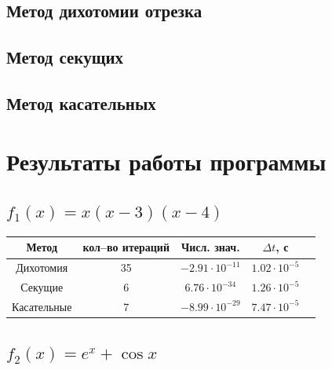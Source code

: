 \documentclass[a4paper,12pt]{extarticle}
\begin{document}
    \subsection{Метод дихотомии отрезка}

    \newpage

    \subsection{Метод секущих}

    \newpage

    \subsection{Метод касательных}

    \newpage


    \section{Результаты работы программы}

    \subsection{$f_1(x) = x(x-3)(x-4)$}

    \begin{center}
        \begin{tabular}{ |c|c|c|c|c| }
            \hline
            Метод       & кол--во итераций & Числ. знач.           & $\Delta t$, с       \\
            \hline
            Дихотомия   & 35               & $-2.91\cdot 10^{-11}$ & $1.02\cdot 10^{-5}$ \\
            \hline
            Секущие     & 6                & $6.76\cdot 10^{-34}$  & $1.26\cdot 10^{-5}$ \\
            \hline
            Касательные & 7                & $-8.99\cdot 10^{-29}$ & $7.47\cdot 10^{-5}$ \\
            \hline
        \end{tabular}
    \end{center}

    \subsection{$f_2(x) = e^x + \cos x$}
\end{document}
